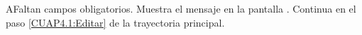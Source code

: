 	\begin{UCtrayectoriaA}{A}{Faltan campos obligatorios.}
		\UCpaso[\UCsist] Muestra el mensaje  en la pantalla  .
		\UCpaso[] Continua en el paso \ref{CUAP4.1:Editar} de la trayectoria principal.
	\end{UCtrayectoriaA}
	

